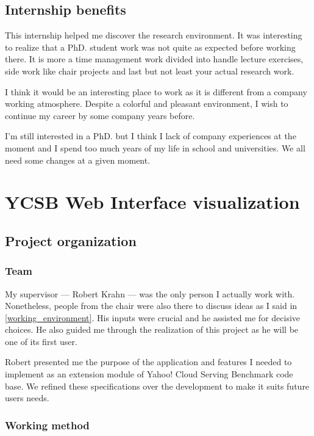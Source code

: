\documentclass[a4paper,11pt]{report}
\begin{document}
\section{Internship benefits}

This internship helped me discover the research environment. It was interesting to realize that a PhD. student work was not quite as expected before working there. It is more a time management work divided into handle lecture exercises, side work like chair projects and last but not least your actual research work.

I think it would be an interesting place to work as it is different from a company working atmosphere. Despite a colorful and pleasant environment, I wish to continue my career by some company years before. 

I'm still interested in a PhD. but I think I lack of company experiences at the moment and I spend too much years of my life in school and universities. We all need some changes at a given moment.

\clearpage

\chapter{YCSB Web Interface visualization}

\section{Project organization}

\subsection{Team}

My supervisor --- Robert Krahn --- was the only person I actually work with. Nonetheless, people from the chair were also there to discuss ideas as I said in \ref{working_environment}. His inputs were crucial and he assisted me for decisive choices. He also guided me through the realization of this project as he will be one of its first user.

Robert presented me the purpose of the application and features I needed to implement as an extension module of Yahoo! Cloud Serving Benchmark code base. We refined these specifications over the development to make it suits future users needs.

\subsection{Working method}\label{working_method}
\end{document}
